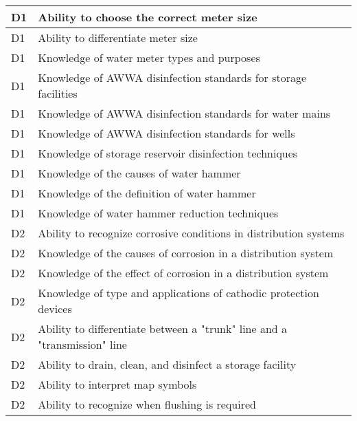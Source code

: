 \begin{table}[H]
\begin{tabular}{| m{1cm} |m{15cm} |}
D1 & Ability to choose the   correct meter size                                                                     \\ \hline
D1 & Ability to   differentiate meter size                                                                          \\ \hline
D1 & Knowledge of water   meter types and purposes                                                                  \\ \hline
D1 & Knowledge of AWWA   disinfection standards for storage facilities                                              \\ \hline
D1 & Knowledge of AWWA   disinfection standards for water mains                                                     \\ \hline
D1 & Knowledge of AWWA   disinfection standards for wells                                                           \\ \hline
D1 & Knowledge of storage   reservoir disinfection techniques                                                       \\ \hline
D1 & Knowledge of the   causes of water hammer                                       \\ \hline
D1 & Knowledge of the   definition of water hammer                                   \\ \hline
D1 & Knowledge of water   hammer reduction techniques                                \\ \hline
D2 & Ability to recognize   corrosive conditions in distribution systems                                            \\ \hline
D2 & Knowledge of the   causes of corrosion in a distribution system                                                \\ \hline
D2 & Knowledge of the   effect of corrosion in a distribution system                                                \\ \hline
D2 & Knowledge of type and   applications of cathodic protection devices                                            \\ \hline
D2 & Ability to   differentiate between a "trunk" line and a "transmission"   line                                  \\ \hline
D2 & Ability to drain,   clean, and disinfect a storage facility                                                    \\ \hline
D2 & Ability to interpret   map symbols                                                                             \\ \hline
D2 & Ability to recognize   when flushing is required                                                               \\ \hline
\end{tabular}
\end{table}
\newpage




